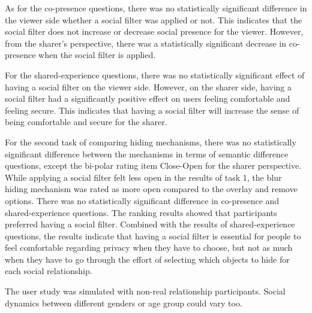 As for the co-presence questions, there was no statistically significant difference in the viewer side whether a social filter was applied or not. This indicates that the social filter does not increase or decrease social presence for the viewer. However, from the sharer's perspective, there was a statistically significant decrease in co-presence when the social filter is applied. 

For the shared-experience questions, there was no statistically significant effect of having a social filter on the viewer side. However, on the sharer side, having a social filter had a significantly positive effect on users feeling comfortable and feeling secure. This indicates that having a social filter will increase the sense of being comfortable and secure for the sharer. 

For the second task of comparing hiding mechanisms, there was no statistically significant difference between the mechanisms in terms of semantic difference questions, except the bi-polar rating item Close-Open for the sharer perspective. While applying a social filter felt less open in the results of task 1, the blur hiding mechanism was rated as more open compared to the overlay and remove options. There was no statistically significant difference in co-presence and shared-experience questions. 
The ranking results showed that participants preferred having a social filter. Combined with the results of shared-experience questions, the results indicate that having a social filter is essential for people to feel comfortable regarding privacy when they have to choose, but not as much when they have to go through the effort of selecting which objects to hide for each social relationship. 


The user study was simulated with non-real relationship participants. Social dynamics between different genders or age group could vary too. 

